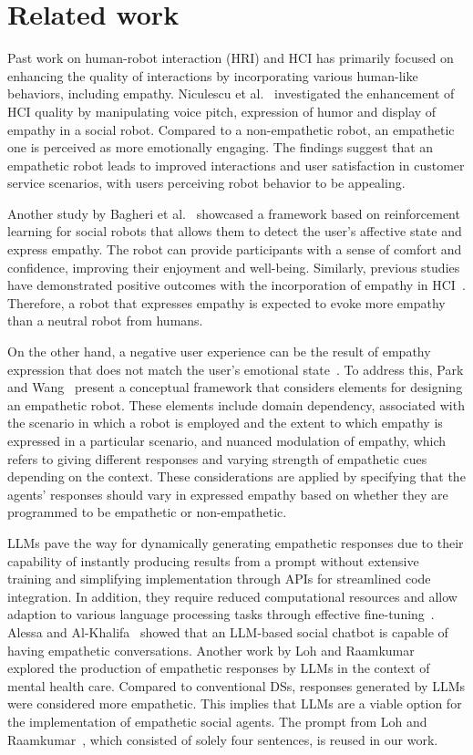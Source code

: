 \documentclass[runningheads]{llncs}
\begin{document}
\section{Related work}
\vspace{-0.75em}
Past work on human-robot interaction (HRI) and HCI has primarily focused on enhancing the quality of interactions by incorporating various human-like behaviors, including empathy. Niculescu et al.~\cite{niculescu} investigated the enhancement of HCI quality by manipulating voice pitch, expression of humor and display of empathy in a social robot. Compared to a non-empathetic robot, an empathetic one is perceived as more emotionally engaging. The findings suggest that an empathetic robot leads to improved interactions and user satisfaction in customer service scenarios, with users perceiving robot behavior to be appealing.

Another study by Bagheri et al.~\cite{bagheri2021} showcased a framework based on reinforcement learning for social robots that allows them to detect the user’s affective state and express empathy. The robot can provide participants with a sense of comfort and confidence, improving their enjoyment and well-being. Similarly, previous studies have demonstrated positive outcomes with the incorporation of empathy in HCI~\cite{leite,jesin,bickmore}. Therefore, a robot that expresses empathy is expected to evoke more empathy than a neutral robot from humans.

On the other hand, a negative user experience can be the result of empathy expression that does not match the user's emotional state~\cite{cramer,ochs}. To address this, Park and Wang~\cite{park} present a conceptual framework that considers elements for designing an empathetic robot. These elements include domain dependency, associated with the scenario in which a robot is employed and the extent to which empathy is expressed in a particular scenario, and nuanced modulation of empathy, which refers to giving different responses and varying strength of empathetic cues depending on the context. These considerations are applied by specifying that the agents' responses should vary in expressed empathy based on whether they are programmed to be empathetic or non-empathetic.

LLMs pave the way for dynamically generating empathetic responses due to their capability of instantly producing results from a prompt without extensive training and simplifying implementation through APIs for streamlined code integration. In addition, they require reduced computational resources and allow adaption to various language processing tasks through effective fine-tuning~\cite{kasneci}. Alessa and Al-Khalifa~\cite{alessa} showed that an LLM-based social chatbot is capable of having empathetic conversations. Another work by Loh and Raamkumar~\cite{loh} explored the production of empathetic responses by LLMs in the context of mental health care. Compared to conventional DSs, responses generated by LLMs were considered more empathetic. This implies that LLMs are a viable option for the implementation of empathetic social agents. The prompt from Loh and Raamkumar~\cite{loh}, which consisted of solely four sentences, is reused in our work.
\end{document}
